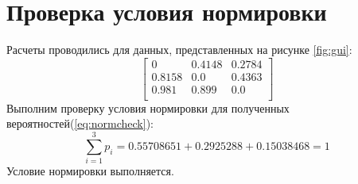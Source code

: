 \section{Проверка условия нормировки}
Расчеты проводились для данных, представленных на рисунке \ref{fig:gui}:
\begin{equation}
    \renewcommand\arraystretch{1.5}
    \begin{bmatrix}
        0 & 0.4148 & 0.2784 \\
        0.8158 & 0.0 & 0.4363 \\
        0.981 & 0.899 & 0.0 \\
    \end{bmatrix}
\end{equation}
Выполним проверку условия нормировки для полученных вероятностей(\ref{eq:normcheck}):
\begin{equation}\label{eq:normcheck}
    \sum_{i = 1}^{3}p_i = 0.55708651 + 0.2925288 + 0.15038468 = 1
\end{equation}
Условие нормировки выполняется.
